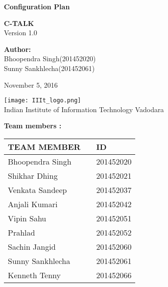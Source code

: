 \documentclass[12pt]{article}
\def\mydate{November 5, 2016}
\begin{document}
	
	\begin{titlepage}
		\begin{center}
			
			
			\LARGE{\textbf{Configuration Plan}}
			
			\vspace{1.5cm}
			
			\textbf{C-TALK}\\
			
			\small{Version 1.0}
			\vspace{2cm}
		 
        \large{\textbf{Author:}}
			  \large{ \\ Bhoopendra Singh(201452020) \\Sunny Sankhlecha(201452061)}	
			  
			  
			\vspace{1.5cm}
			\mydate{}
			
			
			\vspace{5cm}
			\texttt{[image: IIIt\_logo.png]} \\
			\Large{Indian Institute of Information Technology Vadodara} \\
			
		\end{center}
	\end{titlepage}
	\textbf{Team members :} \\
		\begin{center}
		
		\begin{tabular}{ |m{10em} m{8em} m{9em}|}
			\hline
			TEAM MEMBER          &   & ID        \\
			\hline
			Bhoopendra Singh     &   & 201452020 \\
			Shikhar Dhing        &   & 201452021 \\
			Venkata Sandeep      &   & 201452037 \\
			Anjali Kumari        &   & 201452042 \\
			Vipin Sahu           &   & 201452051 \\
			Prahlad              &   & 201452052 \\ 
			Sachin Jangid        &   & 201452060 \\
			Sunny Sankhlecha     &   & 201452061 \\
			Kenneth Tenny        &   & 201452066 \\
			\hline
		\end{tabular}
		
	\end{center}
	\vspace{2em}
	
\end{document}
